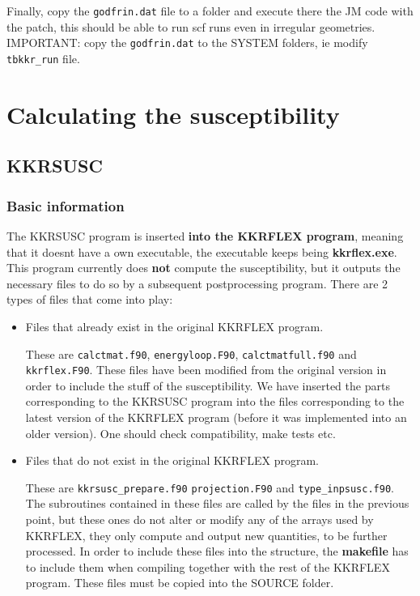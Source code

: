 \documentclass[11pt,fleqn]{book} %
\begin{document}
Finally, copy the \verb|godfrin.dat| file to a folder and execute there the JM code
with the patch, this should be able to run scf runs even in irregular geometries.
IMPORTANT: copy the \verb|godfrin.dat| to the SYSTEM folders, ie modify \verb|tbkkr_run| file.

\chapter{Calculating the susceptibility}
\label{ch:susc}


\section{KKRSUSC}
\label{sec:kkrsusc}

\subsection{Basic information}
\label{sec:kkrsusc-basic-info}

The KKRSUSC program is inserted \textbf{into the KKRFLEX program},
meaning that it doesnt have a own executable, the executable keeps
being \textbf{kkrflex.exe}.
This program currently does \textbf{not} compute the susceptibility, but
it outputs the necessary files to do so by a subsequent postprocessing program.
There are 2 types of files that come into play:
\begin{itemize}
\item Files that already exist in the original KKRFLEX  program.

These are  \verb|calctmat.f90|, \verb|energyloop.F90|, \verb|calctmatfull.f90|
and \verb|kkrflex.F90|. These files have been modified from the original
version in order to include the stuff of the susceptibility.
We have inserted the parts corresponding to the KKRSUSC program into the files corresponding
to the latest version of the KKRFLEX program (before it was implemented into an older version).
One should check compatibility, make tests etc.

\item Files that do not exist in the original KKRFLEX program.

These are
\verb|kkrsusc_prepare.f90| \verb|projection.F90| and  \verb|type_inpsusc.f90|.
The subroutines contained in these files are called by the files in the previous
point, but these ones do not alter or modify any of the arrays used by KKRFLEX,
they only compute and output new quantities, to be further processed.
In order to include these files into the structure, the \textbf{makefile}
has to include them when compiling together with the rest of the KKRFLEX program.
These files must be copied into the SOURCE  folder.




\end{itemize}
\end{document}
